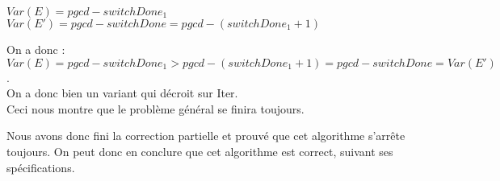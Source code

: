 $Var(E) = pgcd - switchDone_{1}$
$Var(E') = pgcd - switchDone = pgcd - (switchDone_{1}+1)$

On a donc : $Var(E) = pgcd - switchDone_{1} > pgcd - (switchDone_1 +1) = pgcd - switchDone = Var(E')$.\\

On a donc bien un variant qui décroit sur Iter.\\

Ceci nous montre que le problème général se finira toujours. 

Nous avons donc fini la correction partielle et prouvé que cet algorithme s'arrête toujours. On peut donc en conclure que cet algorithme est correct, suivant ses spécifications. \\
